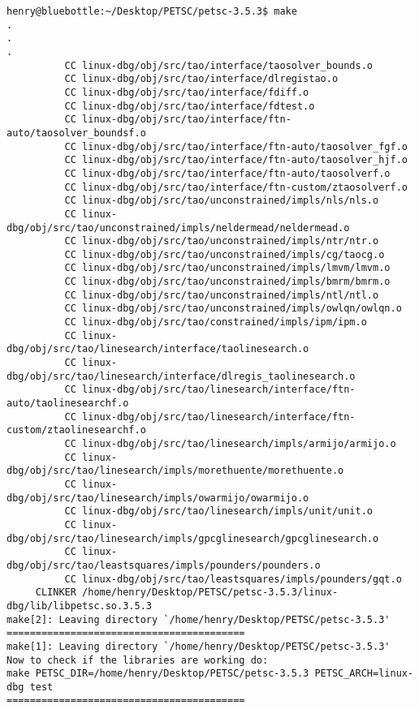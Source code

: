 \documentclass{article}
\begin{document}
\begin{scriptsize}\begin{verbatim}
henry@bluebottle:~/Desktop/PETSC/petsc-3.5.3$ make   
.
.
.
          CC linux-dbg/obj/src/tao/interface/taosolver_bounds.o
          CC linux-dbg/obj/src/tao/interface/dlregistao.o
          CC linux-dbg/obj/src/tao/interface/fdiff.o
          CC linux-dbg/obj/src/tao/interface/fdtest.o
          CC linux-dbg/obj/src/tao/interface/ftn-auto/taosolver_boundsf.o
          CC linux-dbg/obj/src/tao/interface/ftn-auto/taosolver_fgf.o
          CC linux-dbg/obj/src/tao/interface/ftn-auto/taosolver_hjf.o
          CC linux-dbg/obj/src/tao/interface/ftn-auto/taosolverf.o
          CC linux-dbg/obj/src/tao/interface/ftn-custom/ztaosolverf.o
          CC linux-dbg/obj/src/tao/unconstrained/impls/nls/nls.o
          CC linux-dbg/obj/src/tao/unconstrained/impls/neldermead/neldermead.o
          CC linux-dbg/obj/src/tao/unconstrained/impls/ntr/ntr.o
          CC linux-dbg/obj/src/tao/unconstrained/impls/cg/taocg.o
          CC linux-dbg/obj/src/tao/unconstrained/impls/lmvm/lmvm.o
          CC linux-dbg/obj/src/tao/unconstrained/impls/bmrm/bmrm.o
          CC linux-dbg/obj/src/tao/unconstrained/impls/ntl/ntl.o
          CC linux-dbg/obj/src/tao/unconstrained/impls/owlqn/owlqn.o
          CC linux-dbg/obj/src/tao/constrained/impls/ipm/ipm.o
          CC linux-dbg/obj/src/tao/linesearch/interface/taolinesearch.o
          CC linux-dbg/obj/src/tao/linesearch/interface/dlregis_taolinesearch.o
          CC linux-dbg/obj/src/tao/linesearch/interface/ftn-auto/taolinesearchf.o
          CC linux-dbg/obj/src/tao/linesearch/interface/ftn-custom/ztaolinesearchf.o
          CC linux-dbg/obj/src/tao/linesearch/impls/armijo/armijo.o
          CC linux-dbg/obj/src/tao/linesearch/impls/morethuente/morethuente.o
          CC linux-dbg/obj/src/tao/linesearch/impls/owarmijo/owarmijo.o
          CC linux-dbg/obj/src/tao/linesearch/impls/unit/unit.o
          CC linux-dbg/obj/src/tao/linesearch/impls/gpcglinesearch/gpcglinesearch.o
          CC linux-dbg/obj/src/tao/leastsquares/impls/pounders/pounders.o
          CC linux-dbg/obj/src/tao/leastsquares/impls/pounders/gqt.o
     CLINKER /home/henry/Desktop/PETSC/petsc-3.5.3/linux-dbg/lib/libpetsc.so.3.5.3
make[2]: Leaving directory `/home/henry/Desktop/PETSC/petsc-3.5.3'
=========================================
make[1]: Leaving directory `/home/henry/Desktop/PETSC/petsc-3.5.3'
Now to check if the libraries are working do:
make PETSC_DIR=/home/henry/Desktop/PETSC/petsc-3.5.3 PETSC_ARCH=linux-dbg test
=========================================
\end{verbatim}\end{scriptsize}
\end{document}
